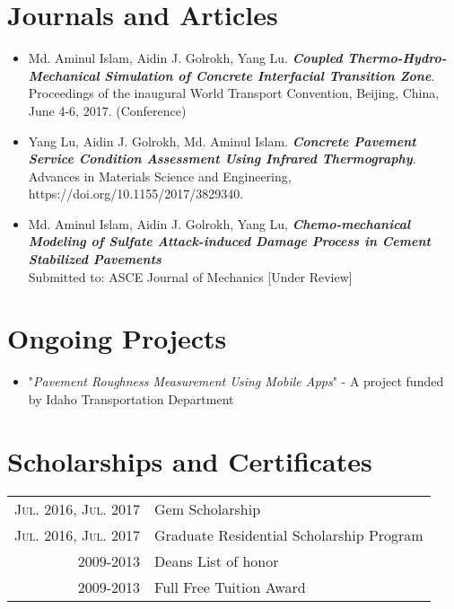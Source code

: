 \documentclass[a4paper,10pt]{article}
\begin{document}
\section{Journals and Articles}
\begin{itemize}
\item
Md. Aminul Islam, Aidin J. Golrokh, Yang Lu. 
\textit{\textbf{Coupled Thermo-Hydro- Mechanical Simulation of Concrete Interfacial Transition Zone}}. 
Proceedings of the inaugural World Transport Convention, Beijing, China, June 4-6, 2017. (Conference)

\item
Yang Lu, Aidin J. Golrokh, Md. Aminul Islam. 
\textit{\textbf{Concrete Pavement Service Condition Assessment Using Infrared Thermography}}.
Advances in Materials Science and Engineering, https://doi.org/10.1155/2017/3829340.

\item
Md. Aminul Islam, Aidin J. Golrokh, Yang Lu,
\textit{\textbf{Chemo-mechanical Modeling of Sulfate Attack-induced Damage Process in Cement Stabilized Pavements}}
\\Submitted to: ASCE Journal of Mechanics [Under Review]
\end{itemize}

\section{Ongoing Projects}
\begin{itemize}
	\item"\textit{Pavement Roughness Measurement Using Mobile Apps}" - A project funded by Idaho Transportation Department
\end{itemize}

\section{Scholarships and Certificates}
\begin{tabular}{rl}
 \textsc{Jul.} 2016, \textsc{Jul.} 2017 & Gem Scholarship \normalsize\\
  \textsc{Jul.} 2016, \textsc{Jul.} 2017 & Graduate Residential Scholarship Program\normalsize\\
  \textsc{2009-2013} & Deans List of honor\\
  \textsc{2009-2013} & Full Free Tuition Award\\
\end{tabular}
\end{document}
